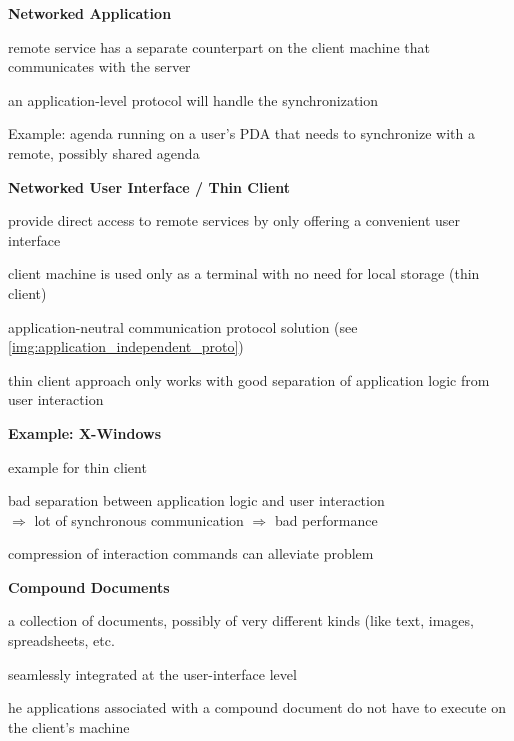 \begin{compactenum}
	\item \textbf{Networked Application}
	\begin{compactitem}
		\item remote service has a separate counterpart on the client machine that communicates with the server
		\item an application-level protocol will handle the synchronization
		\item Example: agenda running on a user's PDA that needs to synchronize with a remote, possibly shared agenda
	\end{compactitem}
	\item \textbf{Networked User Interface / Thin Client}
	\begin{compactitem}
		\item provide direct access to remote services by only offering a convenient user interface
		\item client machine is used only as a terminal with no need for local storage (thin client)
		\item application-neutral communication protocol solution (see \ref{img:application_independent_proto})
		\item thin client approach only works with good separation of application logic from user interaction
		\item \textbf{Example: X-Windows}
		\begin{compactitem}
			\item example for thin client
			\item bad separation between application logic and user interaction \\
			$\Rightarrow$ lot of synchronous communication $\Rightarrow$ bad performance
			\item compression of interaction commands can alleviate problem
		\end{compactitem}
		\item \textbf{Compound Documents}
		\begin{compactitem}
			\item a collection of documents, possibly of very different kinds (like text, images, spreadsheets, etc.
			\item seamlessly integrated at the user-interface level
			\item he applications associated with a compound document do not have to execute on the client's machine
		\end{compactitem}		
	\end{compactitem}
\end{compactenum}

